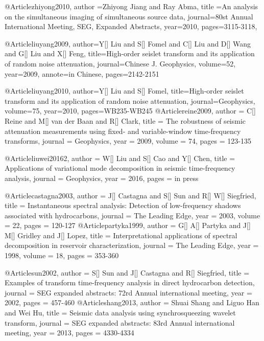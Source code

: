 @Article{zhiyong2010,
  author ={Zhiyong Jiang and Ray Abma},
  title ={An analysis on the simultaneous imaging of simultaneous source data},
  journal={80st Annual International Meeting, SEG, Expanded Abstracts},
  year=2010,
  pages={3115-3118},
}

@Article{liuyang2009,
author={Y[] Liu and S[] Fomel and C[] Liu and D[] Wang and G[] Liu and X[] Feng},
title={High-order seislet transform and its application of random noise attenuation},
journal={Chinese J. Geophysics},
volume=52,
year=2009,
annote={in Chinese},
pages={2142-2151}
}

@Article{liuyang2010,
author={Y[] Liu and S[] Fomel},
title={High-order seislet transform and its application of random noise attenuation},
journal={Geophysics},
volume=75,
year=2010,
pages={WB235-WB245}
}
@Article{reine2009,
  author = 	 {C[] Reine and M[] van der Baan and R[] Clark},
  title = 	 {The robustness of seismic attenuation measurements using fixed- and variable-window time-frequency transforms},
  journal = 	 {Geophysics},
  year = 	 2009,
  volume = 	 74,
  pages = 	 {123-135}
}

@Article{liuwei20162,
  author = 	 {W[] Liu and S[] Cao and Y[] Chen},
  title = 	 {Applications of variational mode decomposition in seismic time-frequency analysis},
  journal = 	 {Geophysics},
  year = 	 2016,
  pages = 	 {in press}
}

@Article{castagna2003,
  author = 	 {J[] Castagna and S[] Sun and R[] W[] Siegfried},
  title = 	 {Instantaneous spectral analysis: Detection of low-frequency shadows associated with hydrocarbons},
  journal = 	 {The Leading Edge},
  year = 	 2003,
  volume = 	 22,
  pages = 	 {120-127}
}
@Article{partyka1999,
  author = 	 {G[] A[] Partyka and J[] M[] Gridley and J[] Lopez},
  title = 	 {Interpretational applications of spectral decomposition in reservoir characterization},
  journal = 	 {The Leading Edge},
  year = 	 1998,
  volume = 	 18,
  pages = 	 {353-360}
}


@Article{sun2002,
  author = 	 {S[] Sun and J[] Castagna and R[] Siegfried},
  title = 	 {Examples of 
   transform time-frequency analysis in direct hydrocarbon detection},
  journal = 	 {SEG expanded abstracts: 72rd Annual international meeting},
  year = 	 2002,
  pages = 	 {457-460}
}
@Article{shang2013,
  author = 	 {Shuai Shang and Liguo Han and Wei Hu},
  title = 	 {Seismic data analysis using synchrosqueezing wavelet transform},
  journal = 	 {SEG expanded abstracts: 83rd Annual international meeting},
  year = 	 2013,
  pages = 	 {4330-4334}
}

